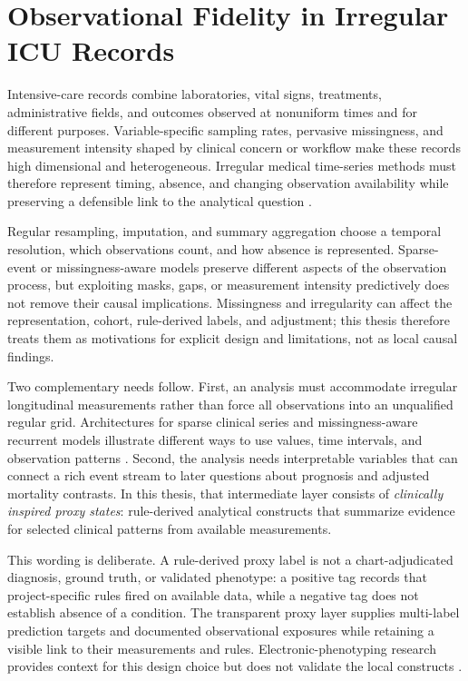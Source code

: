 \section{Observational Fidelity in Irregular ICU Records}
\label{sec:introduction:motivation-irregular-icu-time-series-analysis}

Intensive-care records combine laboratories, vital signs, treatments, administrative fields, and outcomes observed at nonuniform times and for different purposes.  Variable-specific sampling rates, pervasive missingness, and measurement intensity shaped by clinical concern or workflow make these records high dimensional and heterogeneous.  Irregular medical time-series methods must therefore represent timing, absence, and changing observation availability while preserving a defensible link to the analytical question \cite{sun_2026_review_irregular_medical_timeseries}.

Regular resampling, imputation, and summary aggregation choose a temporal resolution, which observations count, and how absence is represented.  Sparse-event or missingness-aware models preserve different aspects of the observation process, but exploiting masks, gaps, or measurement intensity predictively does not remove their causal implications.  Missingness and irregularity can affect the representation, cohort, rule-derived labels, and adjustment; this thesis therefore treats them as motivations for explicit design and limitations, not as local causal findings.

Two complementary needs follow.  First, an analysis must accommodate irregular longitudinal measurements rather than force all observations into an unqualified regular grid.  Architectures for sparse clinical series and missingness-aware recurrent models illustrate different ways to use values, time intervals, and observation patterns \cite{tipirneni2022strats,che2018grud}.  Second, the analysis needs interpretable variables that can connect a rich event stream to later questions about prognosis and adjusted mortality contrasts.  In this thesis, that intermediate layer consists of \emph{clinically inspired proxy states}: rule-derived analytical constructs that summarize evidence for selected clinical patterns from available measurements.

This wording is deliberate.  A rule-derived proxy label is not a chart-adjudicated diagnosis, ground truth, or validated phenotype: a positive tag records that project-specific rules fired on available data, while a negative tag does not establish absence of a condition.  The transparent proxy layer supplies multi-label prediction targets and documented observational exposures while retaining a visible link to their measurements and rules.  Electronic-phenotyping research provides context for this design choice but does not validate the local constructs \cite{banda_2018_electronic_phenotyping}.

